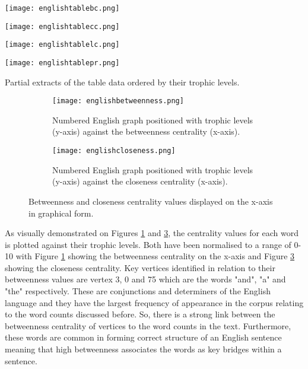 \begin{table}[H]
\centering
\begin{subtable}{.2\textwidth}
	\centering
	\texttt{[image: englishtablebc.png]}
	\caption{}
	\label{table:englishtablebc}
\end{subtable}
\hfill
\begin{subtable}{.2\textwidth}
	\centering
	\texttt{[image: englishtablecc.png]}
	\caption{}
	\label{table:englishtablecc}
\end{subtable}
\hfill
\begin{subtable}{.2\textwidth}
	\centering
	\texttt{[image: englishtablelc.png]}
	\caption{}
	\label{table:englishtablelc}
\end{subtable}
\hfill
\begin{subtable}{.2\textwidth}
	\centering
	\texttt{[image: englishtablepr.png]}
	\caption{}
	\label{table:englishtablepr}
\end{subtable}
\caption{Partial extracts of the table data ordered by their trophic levels.}
\end{table}

\begin{figure}[H]
\centering
\begin{subfigure}{.45\textwidth}
	\hspace{-1cm} 
	\texttt{[image: englishbetweenness.png]}
	\caption{Numbered English graph positioned with trophic levels (y-axis) against the betweenness centrality (x-axis).}
	\label{fig:engbc}
\end{subfigure}
\hfill
\begin{subfigure}{.45\textwidth}
	\hspace{-1cm} 
	\texttt{[image: englishcloseness.png]}
	\caption{Numbered English graph positioned with trophic levels (y-axis) against the closeness centrality (x-axis).}
	\label{fig:engcc}
\end{subfigure}
\caption{Betweenness and closeness centrality values displayed on the x-axis in graphical form.}
\end{figure}

As visually demonstrated on Figures \ref{fig:engbc} and \ref{fig:engcc}, the centrality values for each word is plotted against their trophic levels. Both have been normalised to a range of 0-10 with Figure \ref{fig:engbc} showing the betweenness centrality on the x-axis and Figure \ref{fig:engcc} showing the closeness centrality. Key vertices identified in relation to their betweenness values are vertex 3, 0 and 75 which are the words "and", "a" and "the" respectively. These are conjunctions and determiners of the English language and they have the largest frequency of appearance in the corpus relating to the word counts discussed before. So, there is a strong link between the betweenness centrality of vertices to the word counts in the text. Furthermore, these words are common in forming correct structure of an English sentence meaning that high betweenness associates the words as key bridges within a sentence. 


